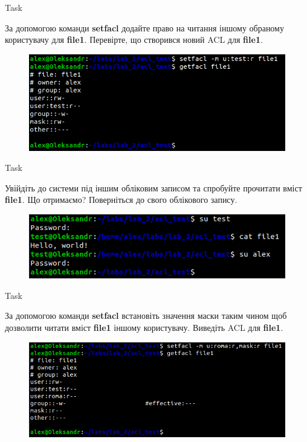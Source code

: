 \documentclass[a4paper,12pt]{article}
\newcommand{\RomanNumeralCaps}[1]{\MakeUppercase{\romannumeral #1}}
\begin{document}
    \begin{center}
        \Large{Task \RomanNumeralCaps{19}}
    \end{center}
    За допомогою команди \textbf{setfacl} додайте право на читання іншому обраному користувачу для \textbf{file1}. Перевірте, що створився новий ACL для \textbf{file1}.
    \begin{figure}[h!]
        \begin{minipage}[h]{1\linewidth}
            \centering
            \includegraphics[width=0.6\linewidth]{Prt sc/Figure_19.png}  
    
        \end{minipage}
    \end{figure}

    \begin{center}
        \Large{Task \RomanNumeralCaps{20}}
    \end{center}
    Увійдіть до системи під іншим обліковим записом та спробуйте прочитати вміст \textbf{file1}. Що отримаємо? Поверніться до свого облікового запису.
    \begin{figure}[h!]
        \begin{minipage}[h]{1\linewidth}
            \centering
            \includegraphics[width=0.6\linewidth]{Prt sc/Figure_20.png}  
        \end{minipage}
    \end{figure}

\newpage
    \begin{center}
        \Large{Task \RomanNumeralCaps{21}}
    \end{center}
    За допомогою команди \textbf{setfacl} встановіть значення маски таким чином щоб дозволити читати вміст \textbf{file1} іншому користувачу. Виведіть ACL для \textbf{file1}.
    \begin{figure}[h!]
        \begin{minipage}[h]{1\linewidth}
            \centering
            \includegraphics[width=0.6\linewidth]{Prt sc/Figure_21.png}  
        \end{minipage}
    \end{figure}
\end{document}
